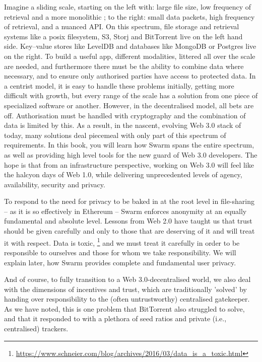 Imagine a sliding scale, starting on the left with: large file size, low frequency of retrieval and a more monolithic ; to the right: small data packets, high frequency of retrieval, and a nuanced API. On this spectrum, file storage and retrieval systems like a posix filesystem, S3, Storj and BitTorrent live on the left hand side. Key--value stores like LevelDB and databases like MongoDB or Postgres live on the right. To build a useful app, different modalities, littered all over the scale are needed, and furthermore there must be the ability to combine data where necessary, and to ensure only authorised parties have access to protected data. In a centrist model, it is easy to handle these problems initially, getting more difficult with growth, but every range of the scale has a solution from one piece of specialized software or another. However, in the decentralised model, all bets are off. Authorisation must be handled with cryptography and the combination of data is limited by this. As a result, in the nascent, evolving Web 3.0 stack of today, many solutions deal piecemeal with only part of this spectrum of requirements. In this book, you will learn how Swarm spans the entire spectrum, as well as providing high level tools for the new guard of Web 3.0 developers. The hope is that from an infrastructure perspective, working on Web 3.0 will feel like the halcyon days of Web 1.0, while delivering unprecedented levels of agency, availability, security and privacy.

To respond to the need for privacy to be baked in at the root level in file-sharing – as it is so effectively in Ethereum – Swarm enforces anonymity at an equally fundamental and absolute level. Lessons from Web 2.0 have taught us that trust should be given carefully and only to those that are deserving of it and will treat it with respect. Data is toxic,%
%
\footnote{\url{https://www.schneier.com/blog/archives/2016/03/data_is_a_toxic.html}}
%
and we must treat it carefully in order to be responsible to ourselves and those for whom we take responsibility. We will explain later, how Swarm provides complete and fundamental user privacy.

And of course, to fully transition to a Web 3.0-decentralised world, we also deal with the dimensions of incentives and trust, which are traditionally 'solved' by handing over responsibility to the (often untrustworthy) centralised gatekeeper. As we have noted, this is one problem that BitTorrent also struggled to solve, and that it responded to with a plethora of seed ratios and private (i.e., centralised) trackers.

